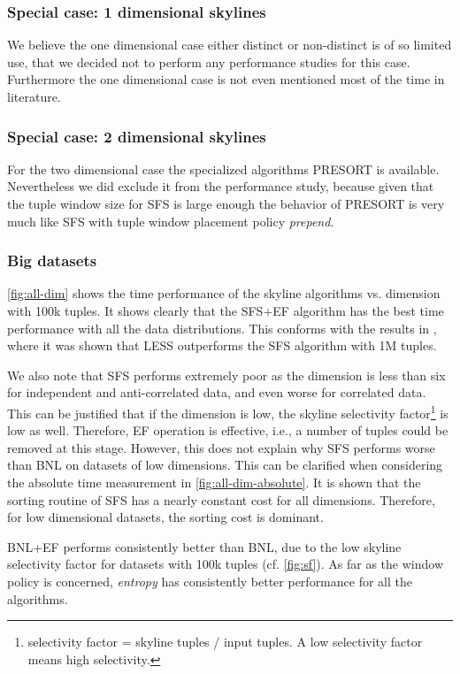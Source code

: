 \subsubsection{Special case: 1 dimensional skylines}
We believe the one dimensional case either distinct or non-distinct is
of so limited use, that we decided not to perform any performance
studies for this case. Furthermore the one dimensional case is not
even mentioned most of the time in literature.

\subsubsection{Special case: 2 dimensional skylines}
For the two dimensional case the specialized algorithms PRESORT is
available.  Nevertheless we did exclude it from the performance
study, because given that the tuple window size for SFS is large enough
the behavior of PRESORT is very much like SFS with tuple window placement
policy \emph{prepend}.

\subsubsection{Big datasets}
\label{sec:big-datasets}
\autoref{fig:all-dim} shows the time performance of the skyline
algorithms vs. dimension with 100k tuples. It shows clearly that the
SFS+EF algorithm has the best time performance with all the data
distributions.  This conforms with the results in \citep{Godfrey2007},
where it was shown that LESS outperforms the SFS algorithm with 1M
tuples.

We also note that SFS performs extremely poor as the dimension is less
than six for independent and anti-correlated data, and even worse for
correlated data.  This can be justified that if the dimension is low,
the skyline selectivity factor\footnote{selectivity factor = skyline
tuples / input tuples. A low selectivity factor means high
selectivity.}  is low as well. Therefore, EF operation is effective,
i.e., a number of tuples could be removed at this stage. However, this
does not explain why SFS performs worse than BNL on datasets of low
dimensions. This can be clarified when considering the absolute time
measurement in \autoref{fig:all-dim-absolute}.  It is shown that
the sorting routine of SFS has a nearly constant cost for all
dimensions. Therefore, for low dimensional datasets, the sorting cost
is dominant.

BNL+EF performs consistently better than BNL, due to the low skyline
selectivity factor for datasets with 100k tuples
(cf. \autoref{fig:sf}).  As far as the window policy is concerned,
\emph{entropy} has consistently better performance for all the
algorithms.

